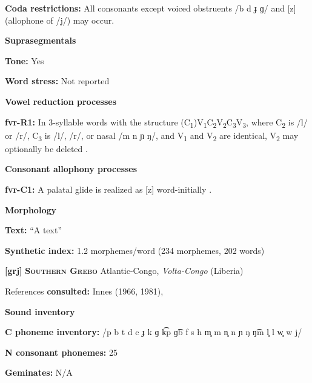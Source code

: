 \textbf{Coda restrictions:} All consonants except voiced obstruents /b d ɟ ɡ/ and [z] (allophone of /j/) may occur.



\textbf{Suprasegmentals}



\textbf{Tone:} Yes



\textbf{Word stress:} Not reported



\textbf{Vowel reduction processes}



\textbf{fvr-R1:} In 3-syllable words with the structure (C\textsubscript{1})V\textsubscript{1}C\textsubscript{2}V\textsubscript{2}C\textsubscript{3}V\textsubscript{3}, where C\textsubscript{2} is /l/ or /r/, C\textsubscript{3} is /l/, /r/, or nasal /m n ɲ ŋ/, and V\textsubscript{1} and V\textsubscript{2} are identical, V\textsubscript{2} may optionally be deleted \citep[60-61]{Jakobi1990}.



\textbf{Consonant allophony processes}



\textbf{fvr-C1:} A palatal glide is realized as [z] word-initially \citep[19]{Jakobi1990}.



\textbf{Morphology}



\textbf{Text:} “A  text” \citep[125-127]{Jakobi1990}



\textbf{Synthetic index:} 1.2 morphemes/word (234 morphemes, 202 words)



\textbf{[grj]}   \textbf{\textsc{Southern Grebo}}  Atlantic-Congo, \textit{Volta-Congo} (Liberia)



References \textbf{consulted:} Innes (1966, 1981), \citet{Newman1986}



\textbf{Sound inventory}



\textbf{C phoneme inventory:} /p b t d c ɟ k ɡ k͡p ɡ͡b f s h m̥ m n̥ n ɲ ŋ ŋ͡m l̥ l w̥ w j/



\textbf{N consonant phonemes:} 25



\textbf{Geminates:} N/A




